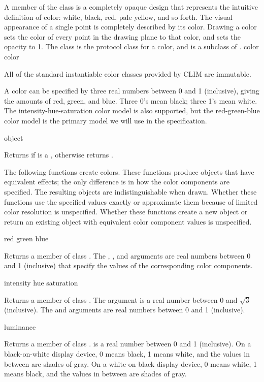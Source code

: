 
A member of the class  is a completely opaque design that represents
the intuitive definition of color: white, black, red, pale yellow, and so forth.
The visual appearance of a single point is completely described by its color.
Drawing a color sets the color of every point in the drawing plane to that
color, and sets the opacity to 1.  The  class is the protocol class
for a color, and is a subclass of .
 {color} {color}

All of the standard instantiable color classes provided by CLIM are immutable.

A color can be specified by three real numbers between 0 and 1 (inclusive),
giving the amounts of red, green, and blue.  Three 0's mean black; three 1's
mean white.  The intensity-hue-saturation color model is also supported, but the
red-green-blue color model is the primary model we will use in the
specification.

 {object}

Returns  if  is a , otherwise returns
.


The following functions create colors.  These functions produce objects that
have equivalent effects; the only difference is in how the color components are
specified.  The resulting objects are indistinguishable when drawn.  Whether
these functions use the specified values exactly or approximate them because of
limited color resolution is unspecified.  Whether these functions create a new
object or return an existing object with equivalent color component values is
unspecified.


 {red green blue}

Returns a member of class .  The , , and
 arguments are real numbers between 0 and 1 (inclusive) that specify
the values of the corresponding color components.


 {intensity hue saturation}

Returns a member of class .  The  argument is a real
number between 0 and $\sqrt{3}$ (inclusive).  The  and 
arguments are real numbers between 0 and 1 (inclusive).


 {luminance}

Returns a member of class .   is a real number between
0 and 1 (inclusive).  On a black-on-white display device, 0 means black, 1 means
white, and the values in between are shades of gray.  On a white-on-black
display device, 0 means white, 1 means black, and the values in between are
shades of gray.


